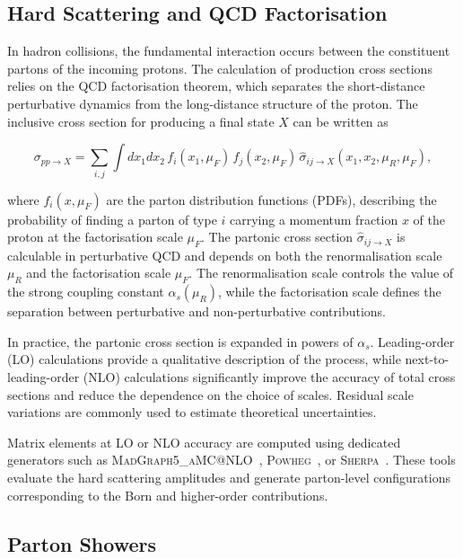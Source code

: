 \subsection*{Hard Scattering and QCD Factorisation}

In hadron collisions, the fundamental interaction occurs between the constituent partons of the incoming protons. 
The calculation of production cross sections relies on the QCD factorisation theorem, which separates the short-distance perturbative dynamics from the long-distance structure of the proton. 
The inclusive cross section for producing a final state $X$ can be written as

\begin{equation}
\sigma_{pp\to X}
=
\sum_{i,j}
\int dx_1 dx_2\,
f_i(x_1,\mu_F)\,
f_j(x_2,\mu_F)\,
\hat{\sigma}_{ij\to X}(x_1,x_2,\mu_R,\mu_F),
\end{equation}

where $f_i(x,\mu_F)$ are the parton distribution functions (PDFs), describing the probability of finding a parton of type $i$ carrying a momentum fraction $x$ of the proton at the factorisation scale $\mu_F$. 
The partonic cross section $\hat{\sigma}_{ij\to X}$ is calculable in perturbative QCD and depends on both the renormalisation scale $\mu_R$ and the factorisation scale $\mu_F$. 
The renormalisation scale controls the value of the strong coupling constant $\alpha_s(\mu_R)$, while the factorisation scale defines the separation between perturbative and non-perturbative contributions.

In practice, the partonic cross section is expanded in powers of $\alpha_s$. 
Leading-order (LO) calculations provide a qualitative description of the process, while next-to-leading-order (NLO) calculations significantly improve the accuracy of total cross sections and reduce the dependence on the choice of scales. 
Residual scale variations are commonly used to estimate theoretical uncertainties.

Matrix elements at LO or NLO accuracy are computed using dedicated generators such as \textsc{MadGraph5\_aMC@NLO}~\cite{Alwall2014MadGraph5aMCNLO}, \textsc{Powheg}~\cite{Nason2004Powheg,Frixione2007PowhegHeavyFlavor,Frixione2007PowhegMethod,Alioli2010PowhegBox}, or \textsc{Sherpa}~\cite{Bothmann2019Sherpa22}. 
These tools evaluate the hard scattering amplitudes and generate parton-level configurations corresponding to the Born and higher-order contributions.

\subsection*{Parton Showers}

